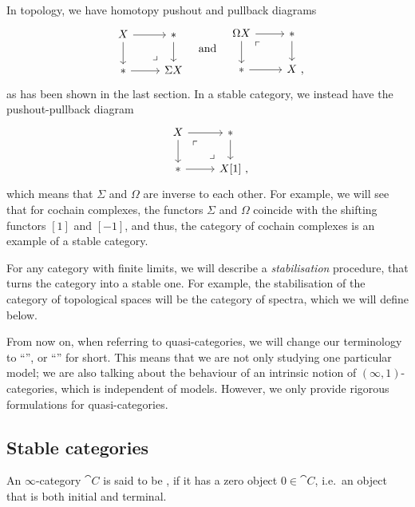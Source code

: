 In topology, we have homotopy pushout and pullback diagrams
\[ \begin{tikzcd}
    X\ar[r]\ar[d]\ar[dr,phantom,pos=.8,"\lrcorner"] & *\ar[d] \\
    *\ar[r] & \Sigma X
\end{tikzcd}
\quad\text{and}\quad
\begin{tikzcd}
    \Omega X\ar[r]\ar[d]\ar[dr,phantom,pos=.2,"\ulcorner"] & *\ar[d] \\
    *\ar[r] & X\rlap{\ ,}
\end{tikzcd} \]
as has been shown in the last section.
In a stable category, we instead have the pushout-pullback diagram
\[ \begin{tikzcd}
    X\ar[r]\ar[d]\ar[dr,phantom,start anchor=south east,"\ulcorner" pos=.25,"\lrcorner" pos=.85] & *\ar[d] \\
    *\ar[r] & X[1]\rlap{\ ,}
\end{tikzcd} \]
which means that $\Sigma$ and $\Omega$ are inverse to each other.
For example, we will see that for cochain complexes,
the functors $\Sigma$ and $\Omega$ coincide with the shifting functors
$[1]$ and $[-1]$, and thus, the category of cochain complexes
is an example of a stable category.

For any category with finite limits, we will describe a \emph{stabilisation}
procedure, that turns the category into a stable one.
For example, the stabilisation of the category of topological spaces
will be the category of spectra, which we will define below.

From now on, when referring to quasi-categories,
we will change our terminology to ``'',
or ``'' for short.
This means that we are not only studying one particular model;
we are also talking about the behaviour of an intrinsic notion of $(\infty,1)$-categories,
which is independent of models.
However, we only provide rigorous formulations for quasi-categories.

\subsection{Stable categories}

\begin{definition}
    An $\infty$-category $\cat C$ is said to be ,
    if it has a zero object $0\in\cat C$,
    i.e.\ an object that is both initial and terminal.
\end{definition}

